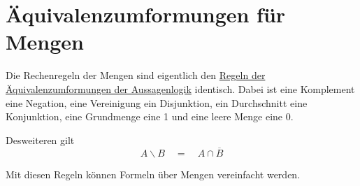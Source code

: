 \documentclass{article}
\begin{document}
\section{Äquivalenzumformungen für Mengen} 
Die Rechenregeln der Mengen sind eigentlich den \hyperref[sec:logik_umformungen]{Regeln der Äquivalenzumformungen der Aussagenlogik} identisch. Dabei ist eine Komplement eine Negation, eine Vereinigung ein Disjunktion, ein Durchschnitt eine Konjunktion, eine Grundmenge eine 1 und eine leere Menge eine 0.

Desweiteren gilt
\[
 A \backslash B \quad = \quad A \cap \overline{B}
\]

Mit diesen Regeln können Formeln über Mengen vereinfacht werden.
\end{document}
